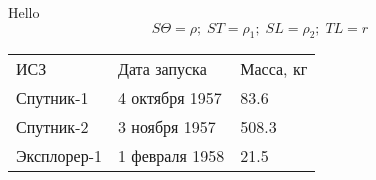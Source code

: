 \documentclass[a4paper,12pt]{article}
\begin{document}
Hello
\[S\Theta = \rho;\;ST = \rho_1;\;SL = \rho_2;\;TL = r\]
\begin{tabular}{ l l l }
ИСЗ & Дата запуска & Масса, кг  \\
Спутник-1 & 4 октября 1957 & 83.6 \\
Спутник-2 & 3 ноября 1957 & 508.3  \\
Эксплорер-1 & 1 февраля 1958 & 21.5 \\
\end{tabular}
\end{document}
